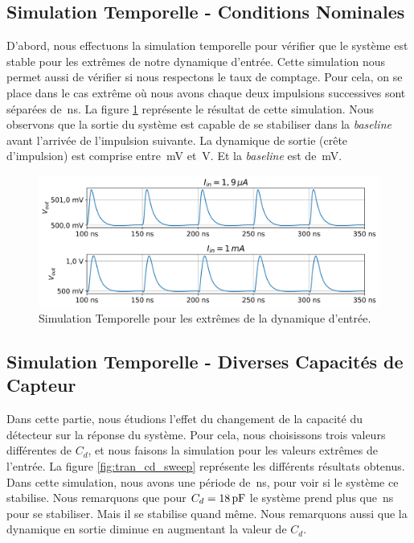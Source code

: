\documentclass[a4paper,12pt]{article}
\numberwithin{equation}{section}
\newcommand{\?}{\stackrel{?}{=}}
\newcommand{\sis}[2]{\complexnum{#1}\,\si[per-mode=symbol]{#2}}
\begin{document}
\subsection{Simulation Temporelle - Conditions Nominales}

D'abord, nous effectuons la simulation temporelle pour vérifier que le système est stable pour les extrêmes de notre dynamique d'entrée. Cette simulation nous permet aussi de vérifier si nous respectons le taux de comptage. Pour cela, on se place dans le cas extrême où nous avons chaque deux impulsions successives sont séparées de \sis{50}{\nano\second}. La figure \ref{fig:tran} représente le résultat de cette simulation. Nous observons que la sortie du système est capable de se stabiliser dans la \textit{baseline} avant l'arrivée de l'impulsion suivante. La dynamique de sortie (crête d'impulsion) est comprise entre \sis{502.03}{\milli\volt} et \sis{1.0859}{\volt}. Et la \textit{baseline} est de \sis{500}{\milli\volt}.

\begin{figure}[htp!]
    \includegraphics[width=\linewidth]{images/tran.png}
    \caption{Simulation Temporelle pour les extrêmes de la dynamique d'entrée.}
    \label{fig:tran}
    \centering
\end{figure}

\subsection{Simulation Temporelle - Diverses Capacités de Capteur}

Dans cette partie, nous étudions l'effet du changement de la capacité du détecteur sur la réponse du système. Pour cela, nous choisissons trois valeurs différentes de $C_d$, et nous faisons la simulation pour les valeurs extrêmes de l'entrée. La figure \ref{fig:tran_cd_sweep} représente les différents résultats obtenus. Dans cette simulation, nous avons une période de \sis{100}{\nano\second}, pour voir si le système ce stabilise. Nous remarquons que pour $C_d = \sis{18}{\pico\farad}$ le système prend plus que \sis{50}{\nano\second} pour se stabiliser. Mais il se stabilise quand même. Nous remarquons aussi que la dynamique en sortie diminue en augmentant la valeur de $C_d$.
\end{document}
